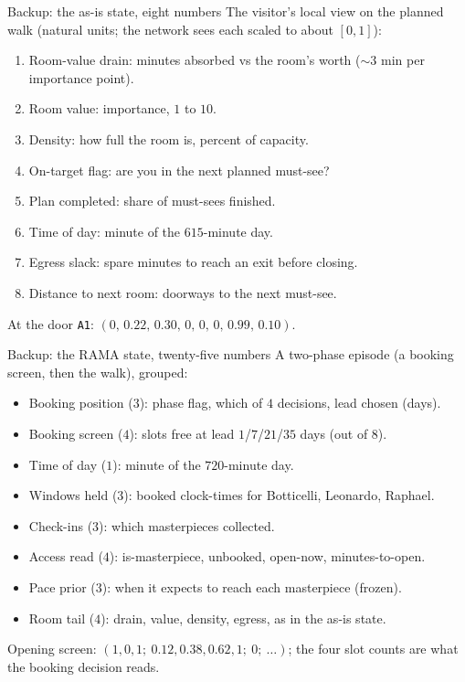 \documentclass[aspectratio=169, 11pt, t]{beamer}
\newcommand{\emp}[1]{#1}
\newcommand{\body}{\large}
\begin{document}
\begin{frame}{Backup: the as-is state, eight numbers}
\body
The visitor's local view on the planned walk (natural units; the network sees each scaled to about
$[0,1]$):
\vfill
\begin{enumerate}\setlength\itemsep{0.55em}
\item \emp{Room-value drain}: minutes absorbed vs the room's worth ($\sim$$3$ min per importance point).
\item \emp{Room value}: importance, $1$ to $10$.
\item \emp{Density}: how full the room is, percent of capacity.
\item \emp{On-target flag}: are you in the next planned must-see?
\item \emp{Plan completed}: share of must-sees finished.
\item \emp{Time of day}: minute of the $615$-minute day.
\item \emp{Egress slack}: spare minutes to reach an exit before closing.
\item \emp{Distance to next room}: doorways to the next must-see.
\end{enumerate}
\vfill
\centering \emp{At the door \texttt{A1}: $(0,\,0.22,\,0.30,\,0,\,0,\,0,\,0.99,\,0.10)$.}
\end{frame}

\begin{frame}{Backup: the RAMA state, twenty-five numbers}
\body
A two-phase episode (a booking screen, then the walk), grouped:
\vfill
\begin{itemize}\setlength\itemsep{0.55em}
\item \emp{Booking position} ($3$): phase flag, which of $4$ decisions, lead chosen (days).
\item \emp{Booking screen} ($4$): slots free at lead $1$/$7$/$21$/$35$ days (out of $8$).
\item \emp{Time of day} ($1$): minute of the $720$-minute day.
\item \emp{Windows held} ($3$): booked clock-times for Botticelli, Leonardo, Raphael.
\item \emp{Check-ins} ($3$): which masterpieces collected.
\item \emp{Access read} ($4$): is-masterpiece, unbooked, open-now, minutes-to-open.
\item \emp{Pace prior} ($3$): when it expects to reach each masterpiece (frozen).
\item \emp{Room tail} ($4$): drain, value, density, egress, as in the as-is state.
\end{itemize}
\vfill
\centering \emp{Opening screen: $(1,0,1;\ 0.12,0.38,0.62,1;\ 0;\ \dots)$; the four slot counts are what the booking decision reads.}
\end{frame}
\end{document}
